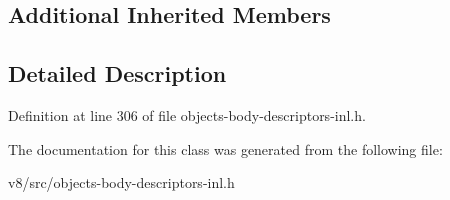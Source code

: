 \subsection*{Additional Inherited Members}


\subsection{Detailed Description}


Definition at line 306 of file objects-\/body-\/descriptors-\/inl.\+h.



The documentation for this class was generated from the following file\+:\begin{DoxyCompactItemize}
\item 
v8/src/objects-\/body-\/descriptors-\/inl.\+h\end{DoxyCompactItemize}
